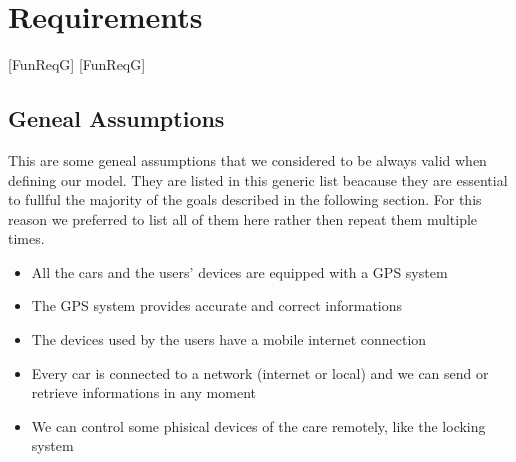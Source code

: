 \pagebreak
\section{Requirements}
\label{sec:req}

[FunReqG]
[FunReqG]

\newenvironment{Goal}[2]{
    \refstepcounter{FunReqG}
    \paragraph{Goal \arabic{FunReqG}:} #2.
    \label{goal:#1}
    \begin{itemize}
}{\end{itemize}}

\newcommand{\Req}[1]{
    \stepcounter{FunReqR}
    \item[] \textbf{Requirement \arabic{FunReqR}}: #1.
}

\newcommand{\Dom}[1]{
    \stepcounter{FunReqD}
    \item[] \textbf{Domain Assumption \arabic{FunReqD}}: #1.
}

\subsection{Geneal Assumptions}
This are some geneal assumptions that we considered to be always valid when defining our model.
They are listed in this generic list beacause they are essential to fullful the majority
of the goals described in the following section. For this reason we preferred to list all
of them here rather then repeat them multiple times.

\begin{itemize}
    \item{All the cars and the users' devices are equipped with a GPS system}
    \item{The GPS system provides accurate and correct informations}
    \item{The devices used by the users have a mobile internet connection}
    \item{Every car is connected to a network (internet or local)
            and we can send or retrieve informations in any moment}
    \item{We can control some phisical devices of the care remotely, like the locking system}
\end{itemize}

